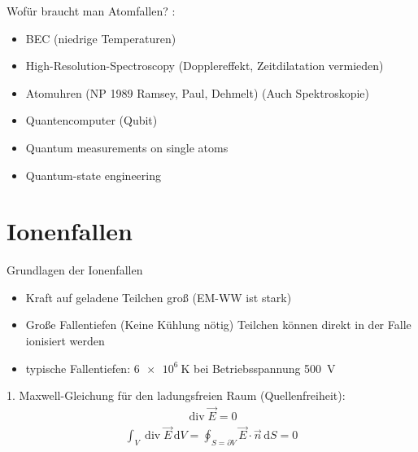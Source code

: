 \documentclass[12pt]{beamer}
\DeclareMathOperator{\divergence}{div}
\begin{document}
\begin{frame}{Wofür braucht man Atomfallen?}
	\cite{wpw}:
	\begin{itemize}
		\item BEC (niedrige Temperaturen)
		\item High-Resolution-Spectroscopy (Dopplereffekt, Zeitdilatation vermieden)
		\item Atomuhren (NP 1989 Ramsey, Paul, Dehmelt) (Auch Spektroskopie)
		\item Quantencomputer (Qubit)
		\item Quantum measurements on single atoms
		\item Quantum-state engineering
	\end{itemize}
\end{frame}


\section{Ionenfallen}

\begin{frame}{Grundlagen der Ionenfallen}
	\begin{itemize}
		\item Kraft auf geladene Teilchen groß (EM-WW ist stark)
		\item Große Fallentiefen (Keine Kühlung nötig) Teilchen können direkt in der Falle ionisiert werden
		\item typische Fallentiefen: $\SI{6e6}{\kelvin}$ bei Betriebsspannung \SI{500}{V}
	\end{itemize}
\end{frame}



\begin{frame}
	1. Maxwell-Gleichung für den ladungsfreien Raum (Quellenfreiheit):
	\begin{align}
	\divergence \vec{E} = 0
	\end{align}
	\begin{align}
	\int_{V} \divergence \vec{E} \, \mathrm{d}V = \oint_{S = \partial V} \vec{E} \cdot \vec{n} \, \mathrm{d}S = 0
	\end{align}
	

\end{frame}
\end{document}
